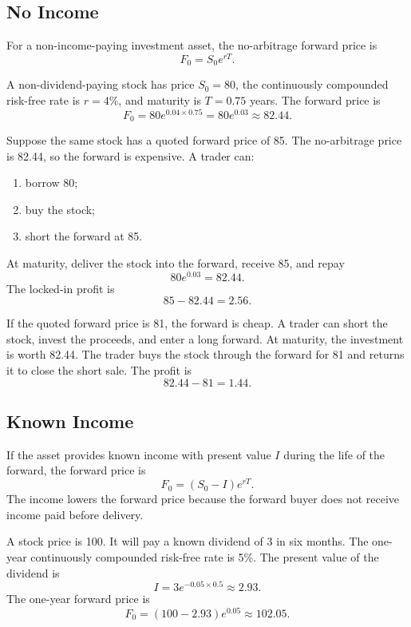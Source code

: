 \subsection{No Income}

For a non-income-paying investment asset, the no-arbitrage forward price is
\[
    F_0=S_0e^{rT}.
\]

\begin{exmp}
A non-dividend-paying stock has price $S_0=80$, the continuously compounded
risk-free rate is $r=4\%$, and maturity is $T=0.75$ years. The forward price is
\[
    F_0=80e^{0.04\times 0.75}=80e^{0.03}\approx 82.44.
\]
\end{exmp}

\begin{exmp}
Suppose the same stock has a quoted forward price of 85. The no-arbitrage price
is 82.44, so the forward is expensive. A trader can:
\begin{enumerate}
    \item borrow 80;
    \item buy the stock;
    \item short the forward at 85.
\end{enumerate}
At maturity, deliver the stock into the forward, receive 85, and repay
\[
    80e^{0.03}=82.44.
\]
The locked-in profit is
\[
    85-82.44=2.56.
\]
\end{exmp}

\begin{exmp}
If the quoted forward price is 81, the forward is cheap. A trader can short the
stock, invest the proceeds, and enter a long forward. At maturity, the investment
is worth 82.44. The trader buys the stock through the forward for 81 and returns
it to close the short sale. The profit is
\[
    82.44-81=1.44.
\]
\end{exmp}

\subsection{Known Income}

If the asset provides known income with present value $I$ during the life of the
forward, the forward price is
\[
    F_0=(S_0-I)e^{rT}.
\]
The income lowers the forward price because the forward buyer does not receive
income paid before delivery.

\begin{exmp}
A stock price is 100. It will pay a known dividend of 3 in six months. The
one-year continuously compounded risk-free rate is 5\%. The present value of the
dividend is
\[
    I=3e^{-0.05\times 0.5}\approx 2.93.
\]
The one-year forward price is
\[
    F_0=(100-2.93)e^{0.05}\approx 102.05.
\]
\end{exmp}

